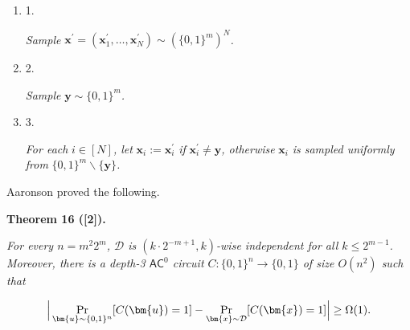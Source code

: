 \documentclass[10pt,a4paper]{article}
\begin{document}
\begin{enumerate}


\item[] 
1. 


\emph{Sample }$\bm{x}^{\prime}=(\bm{x}^{\prime}_{1},\ldots,\bm{x}^{\prime}_{N})\sim(\{0,1\}^{m})^{N}$\emph{.}\par





\item[] 
2. 


\emph{Sample }$\bm{y}\sim\{0,1\}^{m}$\emph{.}\par





\item[] 
3. 


\emph{For each }$i\in[N]$\emph{, let }$\bm{x}_{i}:=\bm{x}^{\prime}_{i}$\emph{ if }$\bm{x}^{\prime}_{i}\neq\bm{y}$\emph{, otherwise }$\bm{x}_{i}$\emph{ is sampled uniformly from
}$\{0,1\}^{m}\smallsetminus\{\bm{y}\}$\emph{.}\par





\end{enumerate}






Aaronson proved the following.\par





\par\medskip\noindent\textbf{
\textbf{Theorem 16}\textbf{ }([2])\textbf{.}
}\par



\emph{For every $n=m^{2}2^{m}$, $\mathcal{D}$ is $(k\cdot 2^{-m+1},k)$-wise independent for all $k\leq 2^{m-1}$. Moreover, there is a depth-3 $\textsf{AC}^{0}$ circuit $C\colon\{0,1\}^{n}\to\{0,1\}$ of size $O(n^{2})$ such that}\par


\[\begin{gathered}
\Big{|}\Pr_{\bm{u}\sim\{0,1\}^{n}}[C(\bm{u})=1]-\Pr_{\bm{x}\sim\mathcal{D}}[C(\bm{x})=1]\Big{|}\geq\Omega(1).
\end{gathered}\]
\end{document}
